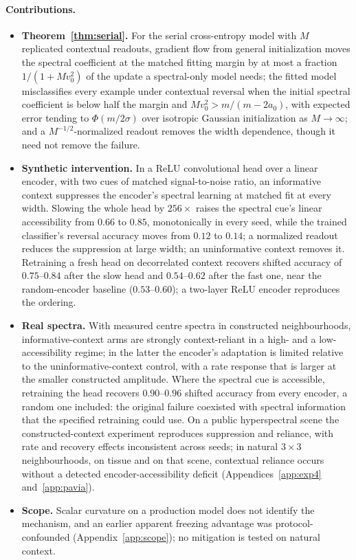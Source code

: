 \paragraph{Contributions.}
\begin{itemize}
\item \textbf{Theorem~\ref{thm:serial}.} For the serial cross-entropy model
  with $M$ replicated contextual readouts, gradient flow from general
  initialization moves the spectral coefficient at the matched fitting
  margin by at most a fraction $1/(1+Mv_0^2)$ of the update a spectral-only
  model needs; the fitted model misclassifies every example under
  contextual reversal when the initial spectral coefficient is below half
  the margin and $Mv_0^2>m/(m-2a_0)$, with expected error tending to
  $\Phi(m/2\sigma)$ over isotropic Gaussian initialization as $M\to\infty$;
  and a $M^{-1/2}$-normalized readout removes the width dependence, though
  it need not remove the failure.
\item \textbf{Synthetic intervention.} In a ReLU convolutional head over a
  linear encoder, with two cues of matched signal-to-noise ratio, an
  informative context suppresses the encoder's spectral learning at
  matched fit at every width. Slowing the whole head by $256\times$ raises
  the spectral cue's linear accessibility from $0.66$ to $0.85$,
  monotonically in every seed, while the trained classifier's reversal
  accuracy moves from $0.12$ to $0.14$; a normalized readout reduces the
  suppression at large width; an uninformative context removes it.
  Retraining a fresh head on decorrelated context recovers shifted
  accuracy of $0.75$--$0.84$ after the slow head and $0.54$--$0.62$ after
  the fast one, near the random-encoder baseline ($0.53$--$0.60$); a
  two-layer ReLU encoder reproduces the ordering.
\item \textbf{Real spectra.} With measured centre spectra in constructed
  neighbourhoods, informative-context arms are strongly context-reliant
  in a high- and a low-accessibility regime; in the latter the encoder's
  adaptation is limited relative to the uninformative-context control,
  with a rate response that is larger at the smaller constructed
  amplitude. Where the spectral cue is accessible, retraining
  the head recovers $0.90$--$0.96$ shifted accuracy from every encoder, a
  random one included: the original failure coexisted with spectral
  information that the specified retraining could use. On a public
  hyperspectral scene the constructed-context experiment reproduces
  suppression and reliance, with rate and recovery effects inconsistent
  across seeds; in natural $3\times3$ neighbourhoods, on tissue and on
  that scene, contextual reliance occurs without a detected
  encoder-accessibility deficit (Appendices~\ref{app:exp4}
  and~\ref{app:pavia}).
\item \textbf{Scope.} Scalar curvature on a production model does not
  identify the mechanism, and an earlier apparent freezing advantage was
  protocol-confounded (Appendix~\ref{app:scope}); no mitigation is tested
  on natural context.
\end{itemize}

